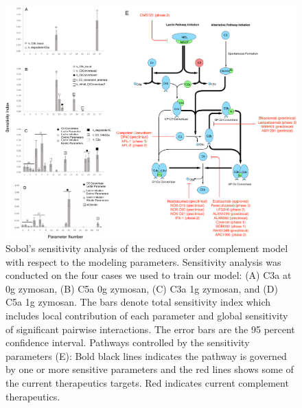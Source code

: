\documentclass[12pt]{article}
\begin{document}
\begin{figure}[h]
\centering
\includegraphics[width=1.0\textwidth]{./figs/Figure4_SEN_v2.pdf}
\caption{Sobol's sensitivity analysis of the reduced order complement model with respect to the modeling parameters.  Sensitivity analysis was conducted on the four cases we used to train our model: (A) C3a at 0g zymosan, (B) C5a 0g zymosan, (C) C3a 1g zymosan, and (D) C5a 1g zymosan. The bars denote total sensitivity index which includes local contribution of each parameter and global sensitivity of significant pairwise interactions. The error bars are the 95 percent confidence interval. Pathways controlled by the sensitivity parameters (E): Bold black lines indicates the pathway is governed by one or more sensitive parameters and the red lines shows some of the current therapeutics targets. Red indicates current complement therapeutics. }\label{fig-SA}
\end{figure}
\end{document}
